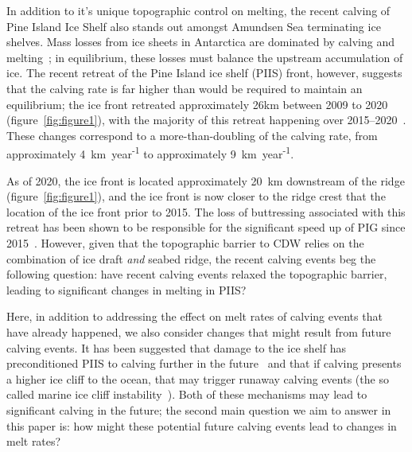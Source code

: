 \documentclass[draft]{agujournal2019}
\begin{document}
In addition to it's unique topographic control on melting, the recent calving of Pine Island Ice Shelf also stands out amongst Amundsen Sea terminating ice shelves. Mass losses from ice sheets in Antarctica are dominated by calving and melting~\cite{Rignot2013Science}; in equilibrium, these losses must balance the upstream accumulation of ice. The recent retreat of the Pine Island ice shelf (PIIS) front, however, suggests that the calving rate is far higher than would be required to maintain an equilibrium; the ice front retreated approximately 26km between 2009 to 2020 (figure~\ref{fig:figure1}), with the majority of this retreat happening over 2015--2020~\cite{Lhermitte2020PNAS, Joughin2021ScienceAdv}. These changes correspond to a more-than-doubling of the calving rate, from approximately 4~km~year\textsuperscript{-1} to approximately 9~km~year\textsuperscript{-1}.

As of 2020, the ice front is located approximately 20~km downstream of the ridge (figure~\ref{fig:figure1}), and the ice front is now closer to the ridge crest that the location of the ice front prior to 2015. The loss of buttressing associated with this retreat has been shown to be responsible for the significant speed up of PIG since 2015~\cite{Joughin2021ScienceAdv}. However, given that the topographic barrier to CDW relies on the combination of ice draft \textit{and} seabed ridge, the recent calving events beg the following question: have recent calving events relaxed the topographic barrier, leading to significant changes in melting in PIIS?

Here, in addition to addressing the effect on melt rates of calving events that have already happened, we also consider changes that might result from future calving events. It has been suggested that damage to the ice shelf has preconditioned PIIS to calving further in the future~\cite{Lhermitte2020PNAS} and that if calving presents a higher ice cliff to the ocean, that may trigger runaway calving events (the so called marine ice cliff instability~\cite{DeConto2016Nature}). Both of these mechanisms may lead to significant calving in the future; the second main question we aim to answer in this paper is: how might these potential future calving events lead to changes in melt rates?
\end{document}
